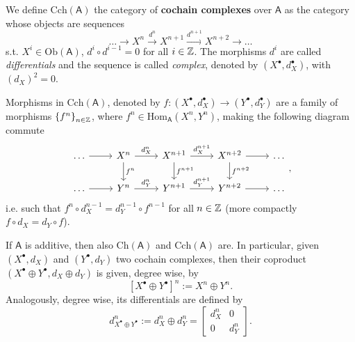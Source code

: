 \begin{defn}
	We define $\mathrm{Cch}(\mathsf{A})$ the category of \textbf{cochain complexes} over $\mathsf{A}$
	as the category whose objects are sequences
	\begin{equation}
	\ldots \to X^n \xrightarrow{d^n} X^{n+1}
	\xrightarrow{d^{n+1}} X^{n+2} \to \ldots
	\end{equation} 
	s.t. $X^i \in \mathrm{Ob} \left(\mathsf{A}\right)$, $d^i \circ d^{i-1} = 0$ for all $i \in \mathbb{Z}$.
	The morphisms $d^i$ are called \textit{differentials} and the sequence is called \textit{complex},
	denoted by $\left( X^{\bullet}, d_X^{\bullet} \right)$, with $\left( d_X \right)^2 = 0$.

	Morphisms in $\mathrm{Cch}(\mathsf{A})$, denoted by
	$f\colon\left(X^{\bullet}, d_X^{\bullet}\right) \to \left(Y^{\bullet}, d_Y^{\bullet}\right)$
	are a family of morphisms $\left\{ f^n \right\}_{n \in \mathbb{Z}}$, where
	$f^n \in \mathrm{Hom}_{\mathsf{A}} \left( X^n, Y^n \right)$,
	making the following diagram commute
	\begin{equation}
	\begin{tikzcd}
		\ldots \arrow[r, "", rightarrow] &
		X^n \arrow[r, "d_X^n", rightarrow] \arrow[d, "f^n", rightarrow] &
		X^{n+1} \arrow[r, "d_X^{n+1}", rightarrow] \arrow[d, "f^{n+1}", rightarrow] &
		X^{n+2} \arrow[r, "", rightarrow] \arrow[d, "f^{n+2}", rightarrow] &
		\ldots \\
		\ldots \arrow[r, "", rightarrow] &
		Y^n \arrow[r, "d_Y^n", rightarrow]&
		Y^{n+1} \arrow[r, "d_Y^{n+1}", rightarrow] &
		Y^{n+2} \arrow[r, "", rightarrow] &
		\ldots
	\end{tikzcd}
	,\end{equation} 
	i.e. such that $f^n \circ d_X^{n-1} = d_Y^{n-1} \circ f^{n-1}$ for all $n \in \mathbb{Z}$
	(more compactly $f \circ d_X = d_Y \circ f$).
\end{defn}

\begin{rem}
	If $\mathsf{A}$ is additive, then also $\mathrm{Ch}(\mathsf{A})$ and $\mathrm{Cch}(\mathsf{A})$ are.
	In particular, given $\left(X^{\bullet}, d_X\right)$ and $\left(Y^{\bullet}, d_Y \right)$ two cochain complexes,
	then their coproduct $\left(X^{\bullet} \oplus Y^{\bullet}, d_X \oplus d_Y\right)$
	is given, degree wise, by
	\begin{equation}
	\left[ X^{\bullet} \oplus Y^{\bullet} \right]^n := X^n \oplus Y^n.
	\end{equation} 
	Analogously, degree wise, its differentials are defined by
	\begin{equation}
	d^n_{X^{\bullet} \oplus Y^{\bullet}} :=
	d^n_X \oplus d^n_Y =
	\begin{bmatrix}
		d^n_X & 0\\
		0 & d^n_Y
	\end{bmatrix} 
	.\end{equation} 
\end{rem}

